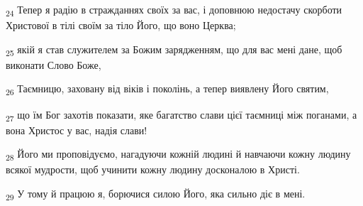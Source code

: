 \begin{tcolorbox}
\textsubscript{24} Тепер я радію в стражданнях своїх за вас, і доповнюю недостачу скорботи Христової в тілі своїм за тіло Його, що воно Церква;
\end{tcolorbox}
\begin{tcolorbox}
\textsubscript{25} якій я став служителем за Божим зарядженням, що для вас мені дане, щоб виконати Слово Боже,
\end{tcolorbox}
\begin{tcolorbox}
\textsubscript{26} Таємницю, заховану від віків і поколінь, а тепер виявлену Його святим,
\end{tcolorbox}
\begin{tcolorbox}
\textsubscript{27} що їм Бог захотів показати, яке багатство слави цієї таємниці між поганами, а вона Христос у вас, надія слави!
\end{tcolorbox}
\begin{tcolorbox}
\textsubscript{28} Його ми проповідуємо, нагадуючи кожній людині й навчаючи кожну людину всякої мудрости, щоб учинити кожну людину досконалою в Христі.
\end{tcolorbox}
\begin{tcolorbox}
\textsubscript{29} У тому й працюю я, борючися силою Його, яка сильно діє в мені.
\end{tcolorbox}
